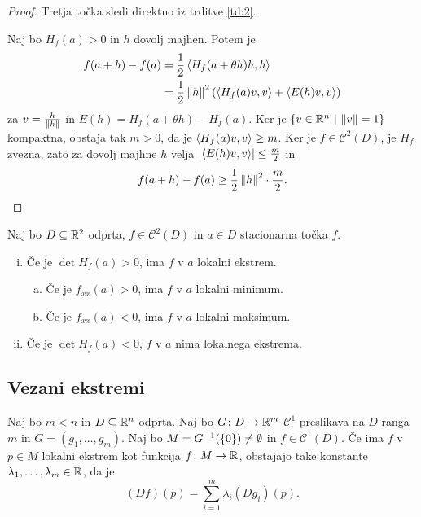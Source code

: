 \begin{proof}
Tretja točka sledi direktno iz trditve \ref{td:2}.

Naj bo $H_f(a) > 0$ in $h$ dovolj majhen. Potem je
\begin{align*}
f(a+h) - f(a) &= \frac{1}{2} \left\langle H_f(a + \theta h)h,h\right\rangle
\\
&= \frac{1}{2} \left\lVert h\right\rVert^2
\left(\left\langle H_f(a)v,v\right\rangle + \left\langle E(h)v,v\right\rangle\right)
\end{align*}
za $v = \frac{h}{\left\lVert h\right\rVert}$ in $E(h) = H_f(a + \theta h) - H_f(a)$.
Ker je $\left\{v \in \mathbb{R}^n~\middle\vert~\left\lVert v\right\rVert = 1\right\}$ kompaktna, obstaja tak
$m > 0$, da je $\left\langle H_f(a)v,v\right\rangle \geq m$. Ker je
$f \in \mathcal{C}^2(D)$, je $H_f$ zvezna, zato za dovolj majhne
$h$ velja $\left\lvert \left\langle E(h)v,v\right\rangle\right\rvert \leq \frac{m}{2}$ in
\[
f(a+h) - f(a) \geq
\frac{1}{2} \left\lVert h\right\rVert^2 \cdot \frac{m}{2}. \qedhere
\]
\end{proof}

\begin{posledica}
Naj bo $D \subseteq \mathbb{R}^2$ odprta, $f \in \mathcal{C}^2(D)$ in
$a \in D$ stacionarna točka $f$.

\begin{enumerate}[i)]
\item Če je $\det H_f(a) > 0$, ima $f$ v $a$ lokalni ekstrem.

\begin{enumerate}[a)]
\item Če je $f_{xx}(a) > 0$, ima $f$ v $a$ lokalni minimum.
\item Če je $f_{xx}(a) < 0$, ima $f$ v $a$ lokalni maksimum.
\end{enumerate}

\item Če je $\det H_f(a) < 0$, $f$ v $a$ nima lokalnega ekstrema.
\end{enumerate}
\end{posledica}

\obvs

\newpage

\subsection{Vezani ekstremi}

\begin{izrek}
Naj bo $m < n$ in $D \subseteq \mathbb{R}^n$ odprta. Naj bo
$G \colon D \to \mathbb{R}^m$ $\mathcal{C}^1$ preslikava na $D$ ranga $m$
in $G = (g_1,\dots,g_m)$. Naj bo
$M = G^{-1}(\left\{0\right\}) \ne \emptyset$ in $f \in \mathcal{C}^1(D)$. Če
ima $f$ v $p \in M$ lokalni ekstrem kot funkcija
$f \colon M \to \mathbb{R}$, obstajajo take konstante
$\lambda_1,\dots,\lambda_m \in \mathbb{R}$, da je
\[
(Df)(p) = \sum_{i=1}^m \lambda_i (Dg_i)(p).
\]
\end{izrek}

